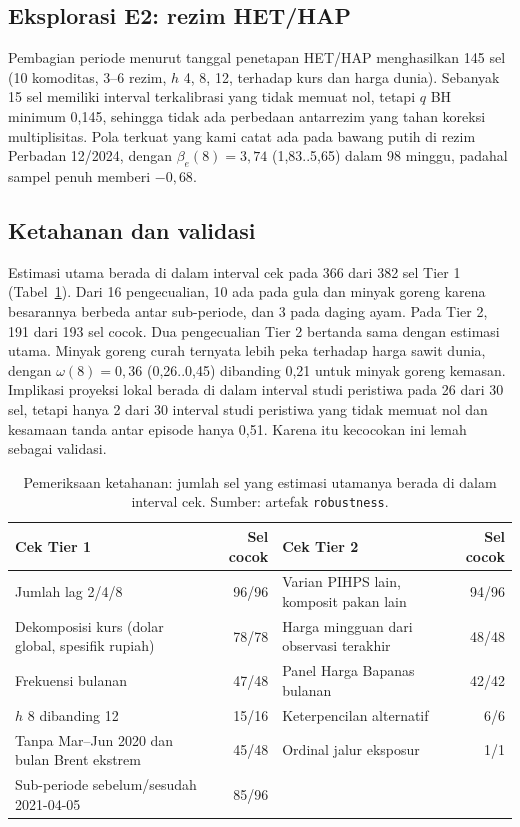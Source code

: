 \documentclass[11pt,a4paper]{article}
\newcommand{\ci}[2]{(#1..#2)}
\begin{document}
\subsection{Eksplorasi E2: rezim HET/HAP}

Pembagian periode menurut tanggal penetapan HET/HAP menghasilkan 145 sel (10 komoditas, 3–6 rezim, $h$ 4, 8, 12, terhadap kurs dan
harga dunia). Sebanyak 15 sel memiliki interval terkalibrasi yang tidak memuat nol, tetapi $q$ BH minimum 0,145, sehingga tidak ada
perbedaan antarrezim yang tahan koreksi multiplisitas. Pola terkuat yang kami catat ada pada bawang putih di rezim Perbadan 12/2024,
dengan $\beta_e(8) = 3,74$ \ci{1,83}{5,65} dalam 98 minggu, padahal sampel penuh memberi $-0,68$.

\subsection{Ketahanan dan validasi}

Estimasi utama berada di dalam interval cek pada 366 dari 382 sel Tier 1 (Tabel~\ref{tab:tier}). Dari 16 pengecualian, 10 ada pada
gula dan minyak goreng karena besarannya berbeda antar sub-periode, dan 3 pada daging ayam. Pada Tier 2, 191 dari 193 sel cocok.
Dua pengecualian Tier 2 bertanda sama dengan estimasi utama. Minyak goreng curah ternyata lebih peka terhadap harga sawit dunia,
dengan $\omega(8) = 0,36$ \ci{0,26}{0,45} dibanding 0,21 untuk minyak goreng kemasan. Implikasi proyeksi lokal berada di dalam
interval studi peristiwa pada 26 dari 30 sel, tetapi hanya 2 dari 30 interval studi peristiwa yang tidak memuat nol dan kesamaan
tanda antar episode hanya 0,51. Karena itu kecocokan ini lemah sebagai validasi.

\begin{table}[!htbp]
\centering\small
\caption{Pemeriksaan ketahanan: jumlah sel yang estimasi utamanya berada di dalam interval cek. Sumber: artefak \texttt{robustness}.}
\label{tab:tier}
\begin{tabularx}{\textwidth}{@{}>{\RaggedRight}X r@{\qquad}>{\RaggedRight}X r@{}}
\toprule
Cek Tier 1 & Sel cocok & Cek Tier 2 & Sel cocok \\
\midrule
Jumlah lag 2/4/8 & 96/96 & Varian PIHPS lain, komposit pakan lain & 94/96 \\
Dekomposisi kurs (dolar global, spesifik rupiah) & 78/78 & Harga mingguan dari observasi terakhir & 48/48 \\
Frekuensi bulanan & 47/48 & Panel Harga Bapanas bulanan & 42/42 \\
$h$ 8 dibanding 12 & 15/16 & Keterpencilan alternatif & 6/6 \\
Tanpa Mar–Jun 2020 dan bulan Brent ekstrem & 45/48 & Ordinal jalur eksposur & 1/1 \\
Sub-periode sebelum/sesudah 2021-04-05 & 85/96 & & \\
\bottomrule
\end{tabularx}
\end{table}
\end{document}
